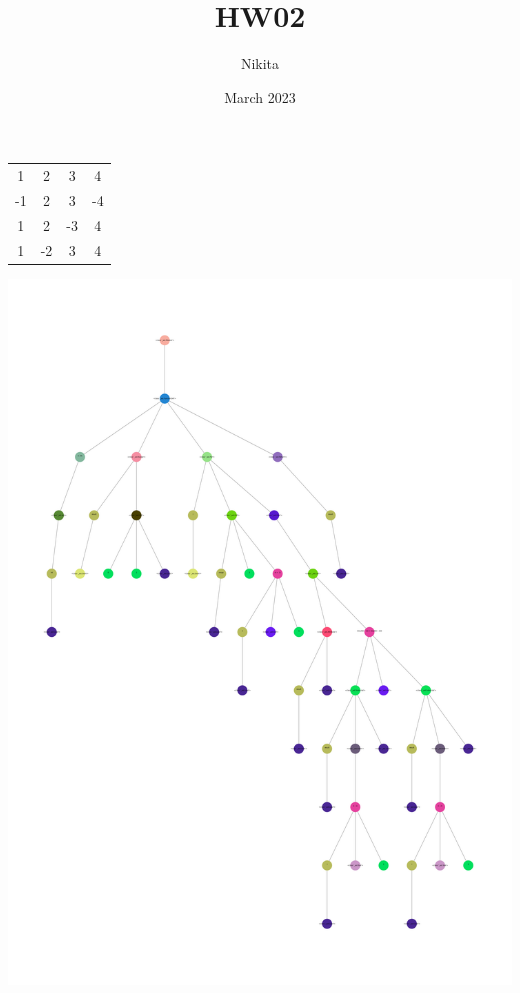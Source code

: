 \documentclass{article}
\begin{document}
\title{HW02}
\author{Nikita}
\date{March 2023}
\begin{center}
\begin{tabular}{|c|c|c|c|}
\hline
1 & 2 & 3 & 4 \\
-1 & 2 & 3 & -4 \\
1 & 2 & -3 & 4 \\
1 & -2 & 3 & 4 \\
\hline
\end{tabular}
\end{center}
\includegraphics[scale=0.05]{artifacts/ast.png}
\end{document}

